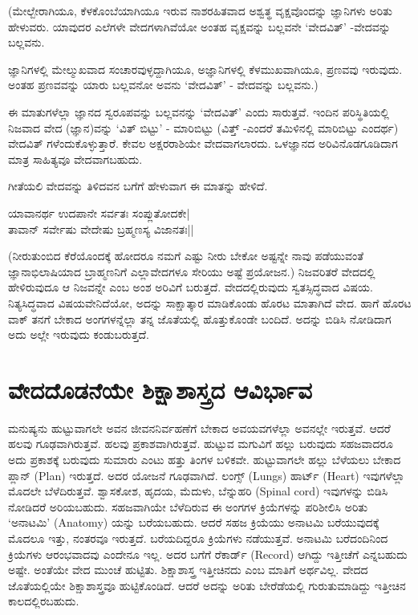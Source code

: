 (ಮೇಲ್ಬೇರಾಗಿಯೂ, ಕೆಳಕೊಂಬೆಯಾಗಿಯೂ ಇರುವ ನಾಶರಹಿತವಾದ ಅಶ್ವತ್ಥ  ವೃಕ್ಷವೊಂದನ್ನು ಜ್ಞಾನಿಗಳು ಅರಿತು ಹೇಳುವರು. ಯಾವುದರ ಎಲೆಗಳೇ ವೇದಗಳಾಗಿವೆಯೋ ಅಂತಹ ವೃಕ್ಷವನ್ನು ಬಲ್ಲವನೇ `ವೇದವಿತ್' -ವೇದವನ್ನು  ಬಲ್ಲವನು.

ಜ್ಞಾನಿಗಳಲ್ಲಿ ಮೇಲ್ಮುಖವಾದ ಸಂಚಾರವುಳ್ಳದ್ದಾಗಿಯೂ, ಅಜ್ಞಾನಿಗಳಲ್ಲಿ ಕೆಳಮುಖವಾಗಿಯೂ, ಪ್ರಣವವು ಇರುವುದು. ಅಂತಹ ಪ್ರಣವವನ್ನು ಯಾರು ಬಲ್ಲವನೋ ಅವನು `ವೇದವಿತ್' - ವೇದವನ್ನು ಬಲ್ಲವನು.)

ಈ ಮಾತುಗಳೆಲ್ಲಾ ಜ್ಞಾನದ ಸ್ವರೂಪವನ್ನು ಬಲ್ಲವನನ್ನು `ವೇದವಿತ್' ಎಂದು ಸಾರುತ್ತವೆ. ಇಂದಿನ ಪರಿಸ್ಥಿತಿಯಲ್ಲಿ ನಿಜವಾದ ವೇದ (ಜ್ಞಾನ)ವನ್ನು `ವಿತ್ ಬಿಟ್ಟು' - ಮಾರಿಬಿಟ್ಟು (ವಿತ್ತ್ -ಎಂದರೆ ತಮಿಳಿನಲ್ಲಿ ಮಾರಿಬಿಟ್ಟು ಎಂದರ್ಥ) ವೇದವಿತ್ ಗಳೆಂದುಕೊಳ್ಳುತ್ತಾರೆ. ಕೇವಲ ಅಕ್ಷರರಾಶಿಯೇ ವೇದವಾಗಲಾರದು. ಒಳಜ್ಞಾನದ ಅರಿವಿನೊಡಗೂಡಿದಾಗ ಮಾತ್ರ  ಸಾಹಿತ್ಯವೂ ವೇದವಾಗಬಹುದು.

ಗೀತೆಯಲಿ ವೇದವನ್ನು ತಿಳಿದವನ ಬಗೆಗೆ ಹೇಳುವಾಗ ಈ ಮಾತನ್ನು ಹೇಳಿದೆ.
\begin{shloka}
ಯಾವಾನರ್ಥ ಉದಪಾನೇ ಸರ್ವತಃ ಸಂಪ್ಲುತೋದಕೇ|\\
ತಾವಾನ್ ಸರ್ವೇಷು ವೇದೇಷು ಬ್ರಹ್ಮಣಸ್ಯ ವಿಜಾನತಃ||
\end{shloka}

(ನೀರುತುಂಬಿದ ಕೆರೆಯೊಂದಕ್ಕೆ  ಹೋದರೂ ನಮಗೆ ಎಷ್ಟು ನೀರು ಬೇಕೋ ಅಷ್ಟನ್ನೇ ನಾವು ಪಡೆಯುವಂತೆ ಜ್ಞಾನಾಭಿಲಾಷಿಯಾದ ಬ್ರಾಹ್ಮಣನಿಗೆ ಎಲ್ಲಾವೇದಗಳೂ ಸೇರಿಯು ಅಷ್ಟೆ ಪ್ರಯೋಜನ.) ನಿಜವರಿತರೆ ವೇದದಲ್ಲಿ ಹೇಳಿರುವುದೂ ಆ ನಿಜವನ್ನೇ ಎಂಬ ಅಂಶ ಅರಿವಿಗೆ ಬರುತ್ತದೆ. ವೇದದಲ್ಲಿರುವುದು ಸ್ವತಸ್ಸಿದ್ಧವಾದ ವಿಷಯ. ನಿತ್ಯಸಿದ್ಧವಾದ ವಿಷಯವೇನಿದೆಯೋ, ಅದನ್ನು ಸಾಕ್ಷಾತ್ಕಾರ ಮಾಡಿಕೊಂಡು ಹೊರಟ ಮಾತಾಗಿದೆ ವೇದ. ಹಾಗೆ ಹೊರಟ ವಾಕ್ ತನಗೆ ಬೇಕಾದ ಅಂಗಗಳನ್ನೆಲ್ಲಾ ತನ್ನ ಜೊತೆಯಲ್ಲಿ ಹೊತ್ತುಕೊಂಡೇ ಬಂದಿದೆ. ಅದನ್ನು ಬಿಡಿಸಿ ನೋಡಿದಾಗ ಅದು ಅಲ್ಲೇ ಇರುವುದು ಕಂಡುಬರುತ್ತದೆ.

\section*{ವೇದದೊಡನೆಯೇ ಶಿಕ್ಷಾಶಾಸ್ತ್ರದ ಆವಿರ್ಭಾವ}

ಮನುಷ್ಯನು ಹುಟ್ಟುವಾಗಲೇ ಅವನ ಜೀವನನಿರ್ವಹಣೆಗೆ ಬೇಕಾದ ಅವಯವಗಳೆಲ್ಲಾ ಅವನಲ್ಲೇ ಇರುತ್ತವೆ. ಆದರೆ ಹಲವು ಗೂಢವಾಗಿರುತ್ತವೆ. ಹಲವು ಪ್ರಕಾಶವಾಗಿರುತ್ತವೆ. ಹುಟ್ಟುವ ಮಗುವಿಗೆ ಹಲ್ಲು ಬರುವುದು ಸಹಜವಾದರೂ ಅದು ಪ್ರಕಾಶಕ್ಕೆ ಬರುವುದು ಸುಮಾರು ಎಂಟು ಹತ್ತು ತಿಂಗಳ ಬಳಿಕವೇ. ಹುಟ್ಟುವಾಗಲೇ ಹಲ್ಲು ಬೆಳೆಯಲು ಬೇಕಾದ ಪ್ಲಾನ್ {(\eng Plan)} ಇರುತ್ತದೆ. ಅದರ ಯೋಜನೆ ಗೂಢವಾಗಿದೆ. ಲಂಗ್ಸ್  {(\eng Lungs)} ಹಾರ್ಟ್ {(\eng Heart)} ಇವುಗಳೆಲ್ಲಾ ಮೊದಲೇ ಬೆಳೆದಿರುತ್ತವೆ. ಶ್ವಾಸಕೋಶ, ಹೃದಯ, ಮೆದುಳು, ಬೆನ್ನುಹರಿ {(\eng Spinal cord)} ಇವುಗಳನ್ನು  ಬಿಡಿಸಿ ನೋಡಿದರೆ ಅರಿಯಬಹುದು. ಸಹಜವಾಗಿಯೇ ಬೆಳೆದಿರುವ ಈ ಅಂಗಗಳ ಕ್ರಿಯೆಗಳನ್ನು ಪರಿಶೀಲಿಸಿ ಅರಿತು `ಅನಾಟಮಿ' {(\eng Anatomy)} ಯನ್ನು ಬರೆಯಬಹುದು. ಆದರೆ ಸಹಜ ಕ್ರಿಯೆಯು ಅನಾಟಮಿ ಬರೆಯುವುದಕ್ಕೆ  ಮೊದಲೂ ಇತ್ತು, ನಂತರವೂ ಇರುತ್ತದೆ. ಬರೆಯದಿದ್ದರೂ ಕ್ರಿಯೆಗಳು ನಡೆಯುತ್ತವೆ. ಅನಾಟಮಿ ಬರೆದಂದಿನಿಂದ ಕ್ರಿಯೆಗಳು ಆರಂಭವಾದವು ಎಂದೇನೂ ಇಲ್ಲ. ಅದರ ಬಗೆಗೆ ರೆಕಾರ್ಡ್ 
{\eng(Record)} ಆಗಿದ್ದು ಇತ್ತೀಚೆಗೆ ಎನ್ನಬಹುದು ಅಷ್ಟೇ. ಅಂತೆಯೇ ವೇದ ಮುಂಚೆ ಹುಟ್ಟಿತು. ಶಿಕ್ಷಾಶಾಸ್ತ್ರ ಇತ್ತೀಚಿನದು ಎಂಬ ಮಾತಿಗೆ ಅರ್ಥವಿಲ್ಲ. ವೇದದ ಜೊತೆಯಲ್ಲಿಯೇ ಶಿಕ್ಷಾಶಾಸ್ತ್ರವೂ ಹುಟ್ಟಿಕೊಂಡಿದೆ. ಆದರೆ ಅದನ್ನು ಅರಿತು ಬೇರೆಡೆಯಲ್ಲಿ ಗುರುತುಮಾಡಿದ್ದು ಇತ್ತೀಚಿನ ಕಾಲದಲ್ಲಿರಬಹುದು.

